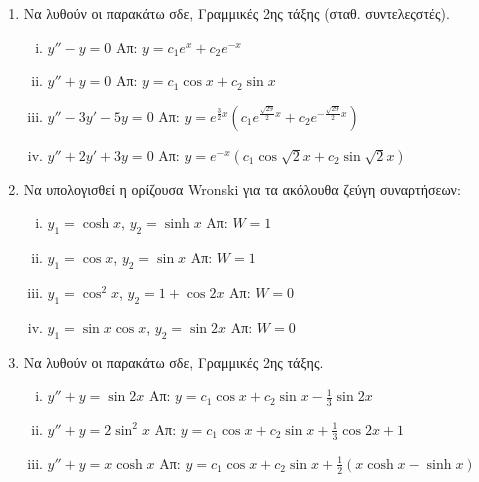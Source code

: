 


\everymath{\displaystyle}
\pagestyle{askhseis}





\begin{center}
  \minibox[c]{\large\bfseries  \textcolor{Col1}{Συνήθεις Διαφορικές Εξισώσεις} \\ 
  \textcolor{Col1}{(Αργυρίου)}}
\end{center}

\vspace{\baselineskip}

\begin{enumerate}

\item Να λυθούν οι παρακάτω σδε, Γραμμικές 2ης τάξης (σταθ. συντελεςστές).

\begin{enumerate}[i)]
\item $y''-y=0$ \hfill Απ: $y=c_1e^x+c_2e^{-x}$
\item $y''+y=0$ \hfill Απ: $y=c_1\cos x+c_2\sin x$
\item $y''-3y'-5y=0$ 
  \hfill Απ: $y=e^{\frac{3}{2}x}(c_1e^{\frac{\sqrt{29}}{2}x}+c_2e^{-
  \frac{\sqrt{29}}{2}x})$
\item $y''+2y'+3y=0$ \hfill Απ: $y=e^{-x}(c_1\cos\sqrt{2}x+c_2\sin\sqrt{2}x)$

\end{enumerate}

\item Να υπολογισθεί η ορίζουσα Wronski για τα ακόλουθα ζεύγη συναρτήσεων:

\begin{enumerate}[i)]
\item $y_1=\cosh x$, $y_2=\sinh x$ \hfill Απ: $W=1$
\item $y_1=\cos x$,  $y_2=\sin x$ \hfill Απ: $W=1$
\item $y_1=\cos^2x$, $y_2=1+\cos 2x$ \hfill Απ: $W=0$
\item $y_1=\sin x\cos x$, $y_2=\sin 2x$ \hfill Απ: $W=0$
\end{enumerate}

\item Να λυθούν οι παρακάτω σδε, Γραμμικές 2ης τάξης.

\begin{enumerate}[i)]
\item $y''+y=\sin 2x$ \hfill Απ: $y=c_1\cos x+c_2\sin x-\frac{1}{3}\sin 2x$
\item $y''+y=2\sin^2 x$ \hfill Απ: $y=c_1\cos x+c_2\sin x+\frac{1}{3}\cos 2x+1$
\item $y''+y=x\cosh x$ \hfill Απ: $y=c_1\cos x+c_2\sin x +\frac{1}{2}(x\cosh x-\sinh x)$
\end{enumerate}


\end{enumerate}
